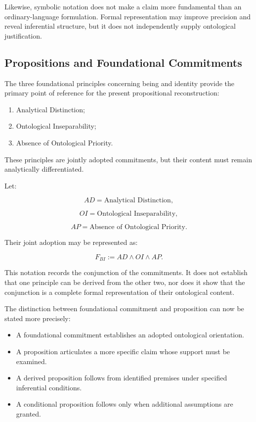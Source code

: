 Likewise, symbolic notation does not make a claim more
fundamental than an ordinary-language formulation. Formal
representation may improve precision and reveal inferential
structure, but it does not independently supply ontological
justification.

\subsection{Propositions and Foundational Commitments}

The three foundational principles concerning being and identity
provide the primary point of reference for the present
propositional reconstruction:

\begin{enumerate}
    \item Analytical Distinction;
    \item Ontological Inseparability;
    \item Absence of Ontological Priority.
\end{enumerate}

These principles are jointly adopted commitments, but their
content must remain analytically differentiated.

Let:

\[
    AD = \text{Analytical Distinction},
\]

\[
    OI = \text{Ontological Inseparability},
\]

\[
    AP = \text{Absence of Ontological Priority}.
\]

Their joint adoption may be represented as:

\[
    F_{BI} := AD \land OI \land AP.
\]

This notation records the conjunction of the commitments. It
does not establish that one principle can be derived from the
other two, nor does it show that the conjunction is a complete
formal representation of their ontological content.

The distinction between foundational commitment and proposition
can now be stated more precisely:

\begin{itemize}
    \item A foundational commitment establishes an adopted
    ontological orientation.

    \item A proposition articulates a more specific claim
    whose support must be examined.

    \item A derived proposition follows from identified premises
    under specified inferential conditions.

    \item A conditional proposition follows only when additional
    assumptions are granted.
\end{itemize}

